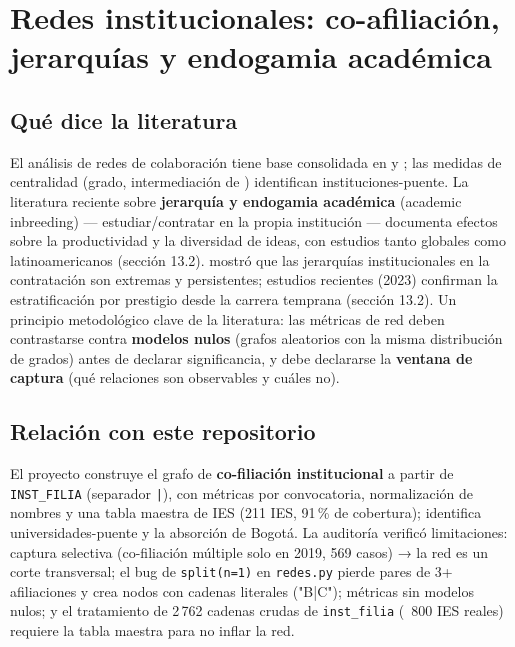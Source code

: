 \section{Redes institucionales: co-afiliación, jerarquías y endogamia académica}

\subsection{Qué dice la literatura}

El análisis de redes de colaboración tiene base consolidada en
\citet{newman2001structure} y \citet{wasserman1994social}; las medidas de
centralidad (grado, intermediación de \citet{freeman1977set}) identifican
instituciones-puente. La literatura reciente sobre \textbf{jerarquía y
endogamia académica} (academic inbreeding) — estudiar/contratar en la propia
institución — documenta efectos sobre la productividad y la diversidad de
ideas, con estudios tanto globales como latinoamericanos (sección 13.2).
\citet{clauset2015systematic} mostró que las jerarquías institucionales en la
contratación son extremas y persistentes; estudios recientes (2023) confirman
la estratificación por prestigio desde la carrera temprana (sección 13.2). Un
principio metodológico clave de la literatura: las métricas de red deben
contrastarse contra \textbf{modelos nulos} (grafos aleatorios con la misma
distribución de grados) antes de declarar significancia, y debe declararse la
\textbf{ventana de captura} (qué relaciones son observables y cuáles no).

\subsection{Relación con este repositorio}

El proyecto construye el grafo de \textbf{co-filiación institucional} a partir
de \texttt{INST\_FILIA} (separador \texttt{|}), con métricas por convocatoria,
normalización de nombres y una tabla maestra de IES (211 IES, 91\,\% de
cobertura); identifica universidades-puente y la absorción de Bogotá. La
auditoría verificó limitaciones: captura selectiva (co-filiación múltiple solo
en 2019, 569 casos) → la red es un corte transversal; el bug de
\texttt{split(n=1)} en \texttt{redes.py} pierde pares de 3+ afiliaciones y crea
nodos con cadenas literales ("B|C"); métricas sin modelos nulos; y el
tratamiento de 2\,762 cadenas crudas de \texttt{inst\_filia} (~800 IES reales)
requiere la tabla maestra para no inflar la red.

